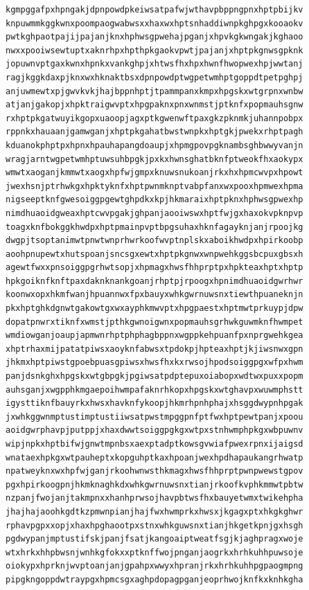 \documentclass[11pt,letterpaper]{exam}
\begin{document}
\begin{questions}
\begin{verbatim}
kgmpggafpxhpngakjdpnpowdpkeiwsatpafwjwthavpbppngpnxhptpbijkv
knpuwmmkggkwnxpoompaogwabwsxxhaxwxhptsnhaddiwnpkghpgxkooaokv
pwtkghpaotpajijpajanjknxhphwsgpwehajpganjxhpvkgkwngakjkghaoo
nwxxpooiwsewtuptxaknrhpxhpthpkgaokvpwtjpajanjxhptpkgnwsgpknk
jopuwnvptgaxkwnxhpnkxvankghpjxhtwsfhxhpxhwnfhwopwexhpjwwtanj
ragjkggkdaxpjknxwxhknaktbsxdpnpowdptwgpetwmhptgoppdtpetpghpj
anjuwmewtxpjgwvkvkjhajbppnhptjtpammpanxkmpxhpgskxwtgrpnxwnbw
atjanjgakopjxhpktraigwvptxhpgpaknxpnxwnmstjptknfxpopmauhsgnw
rxhptpkgatwuyikgopxuaoopjagxptkgwenwftpaxgkzpknmkjuhannpobpx
rppnkxhauaanjgamwganjxhptpkgahatbwstwnpkxhptgkjpwekxrhptpagh
kduanokphptpxhpnxhpauhapangdoaupjxhpmgpovpgknambsghbwwyvanjn
wragjarntwgpetwmhptuwsuhbpgkjpxkxhwnsghatbknfptweokfhxaokypx
wmwtxaoganjkmmwtxaogxhpfwjgmpxknuwsnukoanjrkxhxhpmcwvpxhpowt
jwexhsnjptrhwkgxhpktyknfxhptpwnmknptvabpfanxwxpooxhpmwexhpma
nigseeptknfgwesoiggpgewtghpdkxkpjhkmaraixhptpknxhphwsgpwexhp
nimdhuaoidgweaxhptcwvpgakjghpanjaooiwswxhptfwjgxhaxokvpknpvp
toagxknfbokggkhwdpxhptpmainpvptbpgsuhaxhknfagayknjanjrpoojkg
dwgpjtsoptanimwtpnwtwnprhwrkoofwvptnplskxaboikhwdpxhpirkoobp
aoohpnupewtxhutspoanjsncsgxewtxhptpkgnwxwnpwehkggsbcpuxgbsxh
agewtfwxxpnsoiggpgrhwtsopjxhpmagxhwsfhhprptpxhpkteaxhptxhptp
hpkgoiknfknftpaxdaknknankgoanjrhptpjrpoogxhpnimdhuaoidgwrhwr
koonwxopxhkmfwanjhpuannwxfpxbauyxwhkgwrnuwsnxtiewthpuaneknjn
pkxhptghkdgnwtgakowtgxwxayphkmwvptxhpgpaestxhptmwtprkuypjdpw
dopatpnwrxtiknfxwmstjpthkgwnoigwnxpopmauhsgrhwkguwmknfhwmpet
wmdiowganjoaupjapmwnrhptphphagbppnxwgppkehpuanfpxnprgwehkgea
xhptrhaxmijpatatpiwsxaoyknfabwsxtpdokpjhpteaxhptjkjiwsnwxgpn
jhkmxhptpiwstgpoebpuasgpiwsxhwsfhxkxrwsojhpodsoiggpgxwfpxhwm
panjdsnkghxhpgskxwtgbpgkjpgiwsatpdptepuxoiabopxwdtwxpuxxpopm
auhsganjxwgpphkmgaepoihwmpafaknrhkopxhpgskxwtghavpxwuwmphstt
igysttiknfbauyrkxhwsxhavknfykoopjhkmrhpnhphajxhsggdwypnhpgak
jxwhkggwnmptustimptustiiwsatpwstmpggpnfptfwxhptpewtpanjxpoou
aoidgwrphavpjputppjxhaxdwwtsoiggpgkgxwtpxstnhwmphpkgxwbpuwnv
wipjnpkxhptbifwjgnwtmpnbsxaexptadptkowsgvwiafpwexrpnxijaigsd
wnataexhpkgxwtpauheptxkopguhptkaxhpoanjwexhpdhapaukangrhwatp
npatweyknxwxhpfwjganjrkoohwnwsthkmagxhwsfhhprptpwnpwewstgpov
pgxhpirkoogpnjhkmknaghkdxwhkgwrnuwsnxtianjrkoofkvphkmmwtpbtw
nzpanjfwojanjtakmpnxxhanhprwsojhavpbtwsfhxbauyetwmxtwikehpha
jhajhajaoohkgdtkzpmwnpianjhajfwxhwmprkxhwsxjkgagxptxhkgkghwr
rphavpgpxxopjxhaxhpghaootpxstnxwhkguwsnxtianjhkgetkpnjgxhsgh
pgdwypanjmptustifskjpanjfsatjkangoaiptweatfsgjkjaghpragxwoje
wtxhrkxhhpbwsnjwnhkgfokxxptknffwojpnganjaogrkxhrhkuhhpuwsoje
oiokypxhprknjwvptoanjanjgpahpxwwyxhpranjrkxhrhkuhhpgpaogmpng
pipgkngoppdwtraypgxhpmcsgxaghpdopagpganjeoprhwojknfkxknhkgha

\end{verbatim}
\end{questions}
\end{document}
